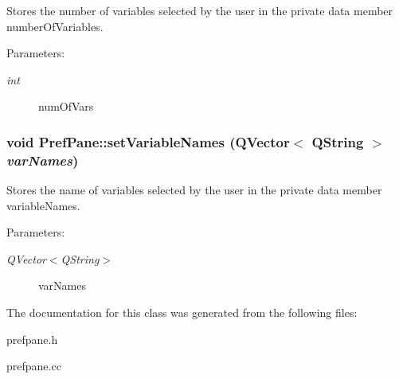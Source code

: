 Stores the number of variables selected by the user in the private data member numberOfVariables. \begin{Desc}
\item[Parameters:]
\begin{description}
\item[{\em int}]numOfVars \end{description}
\end{Desc}
\hypertarget{classPrefPane_68b42771287fe3cda331d8e807e11bda}{
\subsubsection[setVariableNames]{\setlength{\rightskip}{0pt plus 5cm}void PrefPane::setVariableNames (QVector$<$ QString $>$ {\em varNames})}}
\label{classPrefPane_68b42771287fe3cda331d8e807e11bda}


Stores the name of variables selected by the user in the private data member variableNames. \begin{Desc}
\item[Parameters:]
\begin{description}
\item[{\em QVector$<$QString$>$}]varNames \end{description}
\end{Desc}


The documentation for this class was generated from the following files:\begin{CompactItemize}
\item 
prefpane.h\item 
prefpane.cc\end{CompactItemize}
